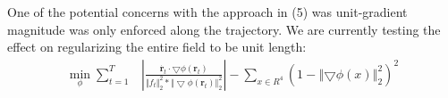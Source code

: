 \documentclass[10pt,letterpaper]{report}
\begin{document}
One of the potential concerns with the approach in (5) was unit-gradient magnitude was only enforced along the trajectory. We are currently testing the effect on regularizing the entire field to be unit length:
\begin{align}
\min_{\phi} \sum^{T}_{t = 1} &  
	\left\vert
	\frac{\dot{\pmb{r}_t} \cdot \bigtriangledown \phi \left( \pmb{r}_t \right)}{{\Vert f_t \Vert}^2_2 * {\Vert \bigtriangledown \phi (\pmb{r}_t) \Vert}^2_2}
	\right\vert
 -
\sum_{x \in R^4}\left( 1-\left\Vert \bigtriangledown \phi ( x ) \right\Vert^2_2 \right)^2
\end{align}
\end{document}
